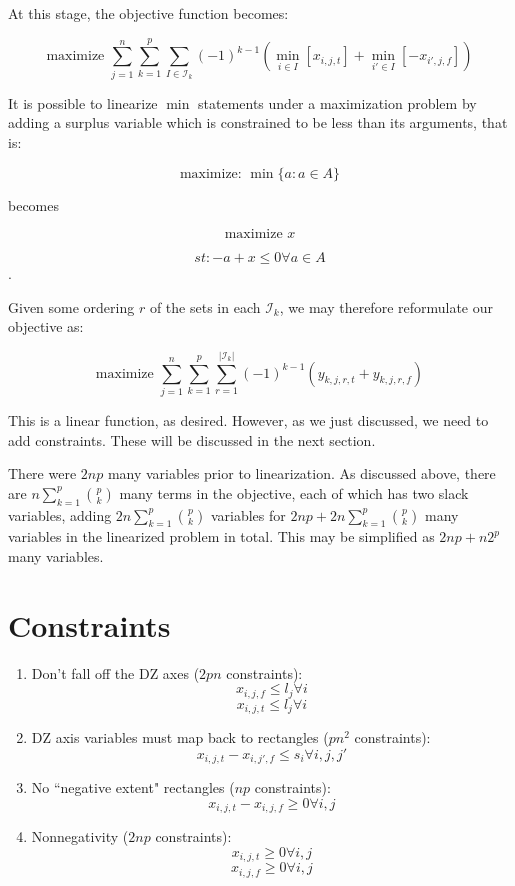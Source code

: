 \documentclass[a4paper]{article}
\begin{document}
At this stage, the objective function becomes:

$$\textrm{maximize }\sum_{j=1}^n\sum_{k=1}^{p} \sum_{I \in \mathcal{I}_k} 
(-1)^{k-1}(\min_{i \in I} [x_{i,j,t}] + \min_{i' \in I} [-x_{i',j,f}])$$

It is possible to linearize $\min$ statements under a maximization problem by adding a surplus variable which is constrained to be less than its arguments, that is:

$$\textrm{maximize: } \min\{a : a \in A\}$$

becomes

$$\textrm{maximize } x$$

$$st: - a + x \leq 0 \forall a \in A$$.

Given some ordering $r$ of the sets in each $\mathcal{I}_k$, we may therefore reformulate our objective as:


$$\textrm{maximize }\sum_{j=1}^n\sum_{k=1}^{p} \sum_{r=1}^{|\mathcal{I}_k|}
(-1)^{k-1} (y_{k,j,r,t} + y_{k,j,r,f})$$

This is a linear function, as desired. However, as we just discussed, we need to add constraints. These will be discussed in the next section.

There were $2np$ many variables prior to linearization. As discussed above, there are $n\sum_{k=1}^p {p \choose k}$ many terms in the objective, each of which has two slack variables, adding $2n \sum_{k=1}^p {p \choose k}$ variables for $2np + 2n\sum_{k=1}^p {p \choose k}$ many variables in the linearized problem in total. This may be simplified as $2np + n2^p$ many variables.

\section{Constraints}

\begin{enumerate}
    \item Don't fall off the DZ axes ($2pn$ constraints):
        $$x_{i,j,f} \leq l_j \forall i$$
        $$x_{i,j,t} \leq l_j \forall i$$
    \item DZ axis variables must map back to rectangles ($pn^2$ constraints):
        $$x_{i,j,t} - x_{i,j',f} \leq s_i \forall i,j,j'$$
    \item No ``negative extent" rectangles ($np$ constraints):
        $$x_{i,j,t} - x_{i,j,f} \geq 0 \forall i,j$$
    \item Nonnegativity ($2np$ constraints):
        $$x_{i,j,t} \geq 0 \forall i,j$$
        $$x_{i,j,f} \geq 0 \forall i,j$$
\end{enumerate}
\end{document}
